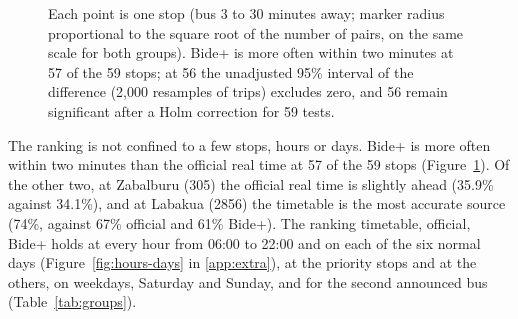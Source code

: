 \begin{figure}[t]
\centering
{}
\caption{Each point is one stop (bus 3 to 30 minutes away; marker radius proportional to the square root of the number of
pairs, on the same scale for both groups). Bide+ is more often within two minutes at 57 of the 59 stops; at 56 the
unadjusted 95\% interval of the difference (2,000 resamples of trips) excludes zero, and 56 remain significant after a
Holm correction for 59 tests.}
\label{fig:stops}
\end{figure}

The ranking is not confined to a few stops, hours or days. Bide+ is more often within two minutes than the official real
time at 57 of the 59 stops (Figure~\ref{fig:stops}). Of the other two, at Zabalburu (305) the official real time is slightly ahead (35.9\% against 34.1\%), and at
Labakua (2856) the timetable is the most accurate source (74\%, against 67\% official and 61\% Bide+). The ranking timetable,
official, Bide+ holds at every hour from 06:00 to 22:00 and on each of the six normal days
(Figure~\ref{fig:hours-days} in \ref{app:extra}), at the priority stops and at the others, on weekdays, Saturday and Sunday, and
for the second announced bus (Table~\ref{tab:groups}).

